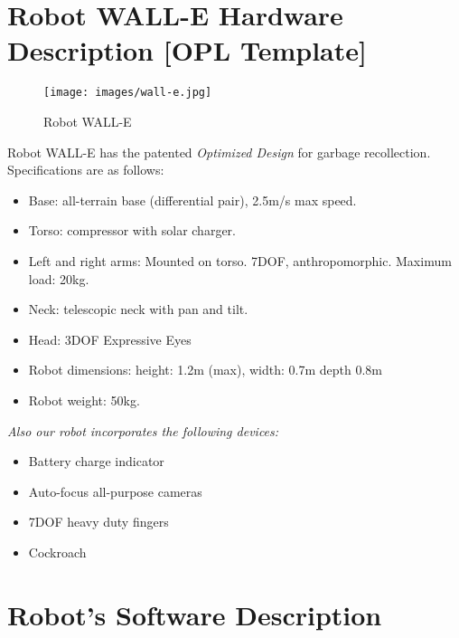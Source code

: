 
\section*{Robot WALL-E Hardware Description [OPL Template]}%
\label{sec:annex-OPL}

\setlength\intextsep{0pt}
\begin{wrapfigure}[10]{r}{0.3\textwidth}
	\centering
	\texttt{[image: images/wall-e.jpg]}
	\caption{Robot WALL-E}%
	\label{fig:wall-e}
\end{wrapfigure}

Robot WALL-E has the patented \textit{\BnL{} Optimized Design} for garbage recollection. Specifications are as follows:

\begin{itemize}
	\item Base: \BnL{} all-terrain base (differential pair), 2.5m/s max speed.
	\item Torso: \BnL{} compressor with solar charger.
	\item Left and right arms: Mounted on torso. \BnL{} 7DOF, anthropomorphic. Maximum load: 20kg.
	\item Neck: \BnL{} telescopic neck with pan and tilt.
	\item Head: 3DOF \BnL{} Expressive Eyes
	\item Robot dimensions: height: 1.2m (max), width: 0.7m depth 0.8m
	\item Robot weight: 50kg.
\end{itemize}

\noindent\textit{Also our robot incorporates the following devices:}

\begin{itemize}
	\item \BnL{} Battery charge indicator
	\item \BnL{} Auto-focus all-purpose cameras
	\item \BnL{} 7DOF heavy duty fingers
	\item \BnL{} Cockroach
\end{itemize}

\section*{Robot's Software Description}

